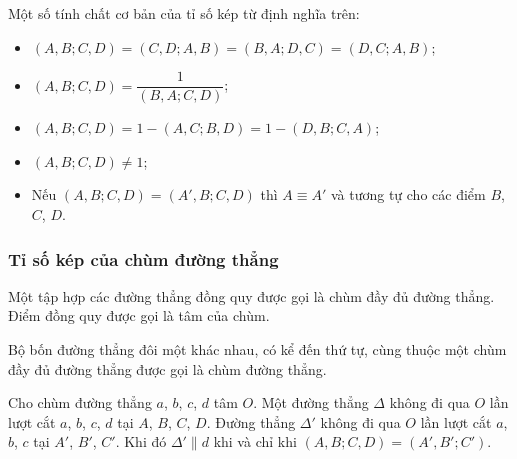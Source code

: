        \begin{property}
            Một số tính chất cơ bản của tỉ số kép từ định nghĩa trên:
            \begin{itemize}
                \itemsep 0.25cm
                \item \((A,B;C,D) = (C,D;A,B) = (B,A;D,C) = (D,C;A,B)\);
                \item \((A,B;C,D) = \dfrac{1}{(B,A;C,D)}\);
                \item \((A,B;C,D) = 1 - (A,C;B,D) = 1 - (D,B;C,A)\);
                \item \((A,B;C,D) \neq 1\);
                \item Nếu \((A,B;C,D) = (A',B;C,D)\) thì \(A \equiv A'\) và tương tự cho các điểm \(B\), \(C\), \(D\).
            \end{itemize}
        \end{property}

    \subsubsection*{Tỉ số kép của chùm đường thẳng}

        \begin{definition}
            Một tập hợp các đường thẳng đồng quy được gọi là chùm đầy đủ đường thẳng. Điểm đồng quy được gọi là tâm của chùm.
        \end{definition}

        \begin{definition}
            Bộ bốn đường thẳng đôi một khác nhau, có kể đến thứ tự, cùng thuộc một chùm đầy đủ đường thẳng được gọi là chùm đường thẳng.
        \end{definition}

        \begin{theorem}
            Cho chùm đường thẳng \(a\), \(b\), \(c\), \(d\) tâm \(O\). Một đường thẳng \(\Delta\) không đi qua \(O\) lần lượt cắt \(a\), \(b\), \(c\), \(d\) tại \(A\), \(B\), \(C\), \(D\). Đường thẳng \(\Delta'\) không đi qua \(O\) lần lượt cắt \(a\), \(b\), \(c\) tại \(A'\), \(B'\), \(C'\). Khi đó \(\Delta' \parallel d\) khi và chỉ khi \((A,B;C,D) = (A',B';C')\).
        \end{theorem}

